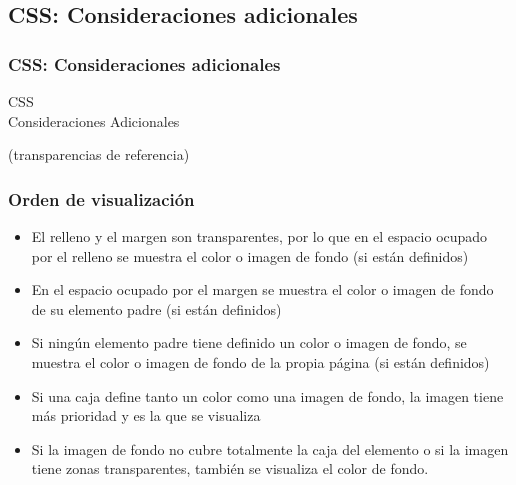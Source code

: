 \documentclass[ucs]{beamer}
\begin{document}







\subsection*{CSS: Consideraciones adicionales}

\begin{frame}[fragile]
\frametitle{CSS: Consideraciones adicionales}

\begin{center}
{\Huge CSS \\ Consideraciones Adicionales}

{\footnotesize (transparencias de referencia)}

\end{center}


\end{frame}




\begin{frame}
\frametitle{Orden de visualización}

\begin{itemize}
  \item El relleno y el margen son transparentes, por lo que en el espacio ocupado por el relleno se muestra el color o imagen de fondo (si están definidos)
  \item En el espacio ocupado por el margen se muestra el color o imagen de fondo de su elemento padre (si están definidos)
  \item Si ningún elemento padre tiene definido un color o imagen de fondo, se muestra el color o imagen de fondo de la propia página (si están definidos)
  \item Si una caja define tanto un color como una imagen de fondo, la imagen tiene más prioridad y es la que se visualiza
  \item Si la imagen de fondo no cubre totalmente la caja del elemento o si la imagen tiene zonas transparentes, también se visualiza el color de fondo. 
\end{itemize}

\end{frame}
\end{document}
